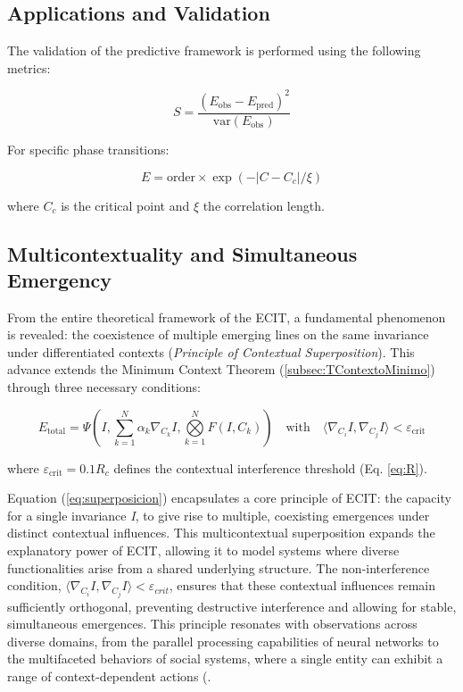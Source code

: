 \documentclass{article}
\begin{document}
\subsection{Applications and Validation}
The validation of the predictive framework is performed using the following metrics:

\begin{equation}
    S = \frac{(E_{\text{obs}} - E_{\text{pred}})^2}{\text{var}(E_{\text{obs}})}
\end{equation}

For specific phase transitions:

\begin{equation}
    E = \text{order} \times \exp(-|C - C_c|/\xi)
\end{equation}

where $C_c$ is the critical point and $\xi$ the correlation length.

\subsection{Multicontextuality and Simultaneous Emergency} \label{sec:multicontext}
From the entire theoretical framework of the ECIT, a fundamental phenomenon is revealed: the coexistence of multiple emerging lines on the same invariance under differentiated contexts (\textit{Principle of Contextual Superposition}). This advance extends the Minimum Context Theorem (\ref{subsec:TContextoMinimo}) through three necessary conditions:

\begin{equation} \label{eq:superposicion}
E_{\text{total}} = \Psi\left(I, \sum\limits_{k=1}^N \alpha_k \nabla_{C_k}I, \bigotimes\limits_{k=1}^N F(I,C_k)\right) \quad \text{with} \quad \langle \nabla_{C_i}I, \nabla_{C_j}I \rangle < \varepsilon_{\text{crit}}
\end{equation}

where $\varepsilon_{\text{crit}} = 0.1R_c$ defines the contextual interference threshold (Eq. \ref{eq:R}). 

\bigskip
\noindent Equation (\ref{eq:superposicion}) encapsulates a core principle of ECIT: the capacity for a single invariance \textit{I}, to give rise to multiple, coexisting emergences under distinct contextual influences. This multicontextual superposition expands the explanatory power of ECIT, allowing it to model systems where diverse functionalities arise from a shared underlying structure. The non-interference condition, $\langle \nabla_{C_i}I, \nabla_{C_j}I \rangle < \varepsilon_{crit}$, ensures that these contextual influences remain sufficiently orthogonal, preventing destructive interference and allowing for stable, simultaneous emergences. This principle resonates with observations across diverse domains, from the parallel processing capabilities of neural networks to the multifaceted behaviors of social systems, where a single entity can exhibit a range of context-dependent actions (\cite{Hofstadter1979}.
\end{document}
